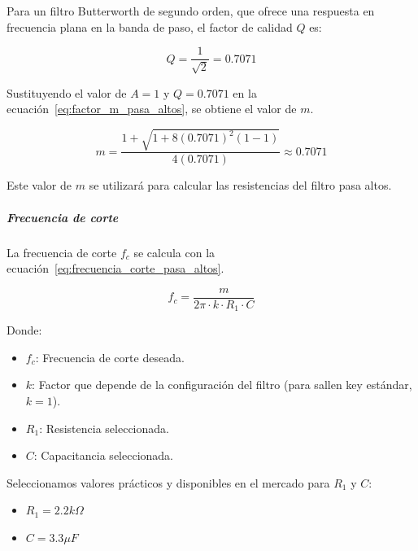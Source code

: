                     Para un filtro Butterworth de segundo orden, que ofrece una respuesta en frecuencia plana en la banda de paso, el factor de calidad $Q$ es:

                    \begin{equation}
                        \label{eq:factor_calidad}
                        Q = \frac{1}{\sqrt{2}} = 0.7071
                    \end{equation}
                
                    Sustituyendo el valor de $A = 1$ y $Q = 0.7071$ en la ecuación~\ref{eq:factor_m_pasa_altos}, se obtiene el valor de $m$.

                    \begin{equation}
                        \label{eq:factor_m_pasa_altos_valor}
                        m = \frac{1+\sqrt{1+8(0.7071)^2(1-1)}}{4(0.7071)} \approx 0.7071
                    \end{equation}

                    Este valor de $m$ se utilizará para calcular las resistencias del filtro pasa altos.

                \subparagraph{Frecuencia de corte}
                    La frecuencia de corte $f_c$ se calcula con la ecuación~\ref{eq:frecuencia_corte_pasa_altos}.

                    \begin{equation}
                        \label{eq:frecuencia_corte_pasa_altos}
                        f_c = \frac{m}{2\pi \cdot k \cdot R_1 \cdot C}
                    \end{equation}

                    Donde:

                    \begin{itemize}
                        \item $f_c$: Frecuencia de corte deseada.
                        \item $k$: Factor que depende de la configuración del filtro (para sallen key estándar, $k = 1$).
                        \item $R_1$: Resistencia seleccionada.
                        \item $C$: Capacitancia seleccionada.
                    \end{itemize}

                    Seleccionamos valores prácticos y disponibles en el mercado para $R_1$ y $C$:
                    \begin{itemize}
                        \item $R_1 = 2.2 k\Omega$
                        \item $C = 3.3 \mu F$
                    \end{itemize}


